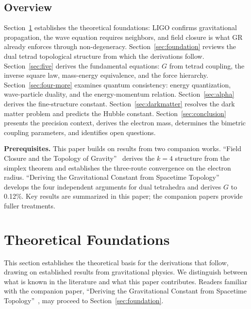 \documentclass[aps,prd,preprint,superscriptaddress,showpacs,preprintnumbers,amsmath,amssymb,nofootinbib]{revtex4-2}
\begin{document}
\subsection{Overview}
\label{subsec:structure}

Section~\ref{sec:theory} establishes the theoretical foundations: LIGO confirms gravitational propagation, the wave equation requires neighbors, and field closure is what GR already enforces through non-degeneracy. Section~\ref{sec:foundation} reviews the dual tetrad topological structure from which the derivations follow. Section~\ref{sec:five} derives the fundamental equations: $G$ from tetrad coupling, the inverse square law, mass-energy equivalence, and the force hierarchy. Section~\ref{sec:four-more} examines quantum consistency: energy quantization, wave-particle duality, and the energy-momentum relation. Section~\ref{sec:alpha} derives the fine-structure constant. Section~\ref{sec:darkmatter} resolves the dark matter problem and predicts the Hubble constant. Section~\ref{sec:conclusion} presents the precision context, derives the electron mass, determines the bimetric coupling parameters, and identifies open questions.

\textbf{Prerequisites.} This paper builds on results from two companion works. ``Field Closure and the Topology of Gravity''~\cite{paper5} derives the $k = 4$ structure from the simplex theorem and establishes the three-route convergence on the electron radius. ``Deriving the Gravitational Constant from Spacetime Topology''~\cite{paper6} develops the four independent arguments for dual tetrahedra and derives $G$ to 0.12\%. Key results are summarized in this paper; the companion papers provide fuller treatments.

\section{Theoretical Foundations}
\label{sec:theory}

This section establishes the theoretical basis for the derivations that follow, drawing on established results from gravitational physics. We distinguish between what is known in the literature and what this paper contributes. Readers familiar with the companion paper, ``Deriving the Gravitational Constant from Spacetime Topology''~\cite{paper6}, may proceed to Section~\ref{sec:foundation}.
\end{document}
